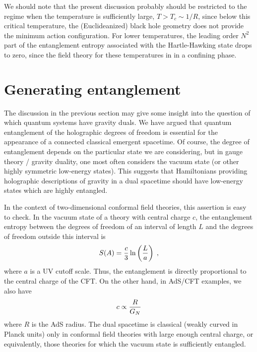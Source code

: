 \documentclass[12pt,epsf]{article}
\renewcommand{\(}{\left(}
\renewcommand{\)}{\right)}
\begin{document}
We should note that the present discussion probably should be restricted to the regime when the temperature is sufficiently large, $T > T_c \sim 1/R$, since below this critical temperature, the (Euclideanized) black hole geometry does not provide the minimum action configuration. For lower temperatures, the leading order $N^2$ part of the entanglement entropy associated with the Hartle-Hawking state drops to zero, since the field theory for these temperatures in in a confining phase.


\section{Generating entanglement}

The discussion in the previous section may give some insight into the question of which quantum systems have gravity duals. We have argued that quantum entanglement of the holographic degrees of freedom is essential for the appearance of a connected classical emergent spacetime. Of course, the degree of entanglement depends on the particular state we are considering, but in gauge theory / gravity duality, one most often considers the vacuum state (or other highly symmetric low-energy states). This suggests that Hamiltonians providing holographic descriptions of gravity in a dual spacetime should have low-energy states which are highly entangled.

In the context of two-dimensional conformal field theories, this assertion is easy to check. In the vacuum state of a theory with central charge $c$, the entanglement entropy between the degrees of freedom of an interval of length $L$ and the degrees of freedom outside this interval is 
\[
S(A) = {c \over 3} \ln \left( {L \over a} \right) \; ,
\]
where $a$ is a UV cutoff scale. Thus, the entanglement is directly proportional to the central charge of the CFT. On the other hand, in AdS/CFT examples, we also have \cite{agmoo}
\[
c \propto {R \over G_N}
\]
where $R$ is the AdS radius. The dual spacetime is classical (weakly curved in Planck units) only in conformal field theories with large enough central charge, or equivalently, those theories for which the vacuum state is sufficiently entangled. 
\end{document}
